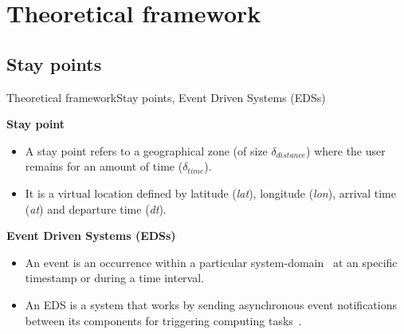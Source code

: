 \section{Theoretical framework}
\subsection{Stay points}
\begin{frame}{Theoretical framework}{Stay points, Event Driven Systems (EDSs)}
\small
\begin{block}{\small \textbf{Stay point}}
\begin{itemize}
  \item A stay point refers to a geographical zone (of size $\delta_{distance}$) where the user remains for an amount of time ($\delta_{time}$).
  \item It is a virtual location defined by latitude (\emph{lat}), longitude (\emph{lon}), arrival time (\emph{at}) and departure time (\emph{dt}).
\end{itemize}
\end{block}

\begin{block}{\small \textbf{Event Driven Systems (EDSs)}}
\begin{itemize}
  \item An event is an occurrence within a particular system-domain~\cite{Etzion2011} at an specific timestamp or during a time interval.
  \item An EDS is a system that works by sending asynchronous event notifications between its components for triggering computing tasks~\cite{Etzion2011,Faison2011}.
\end{itemize}
\end{block}



\end{frame}
